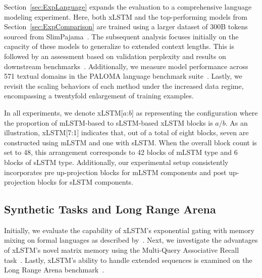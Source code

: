 Section~\ref{sec:ExpLanguage} expands the evaluation to a comprehensive language modeling experiment. Here, both xLSTM and the top-performing models from Section~\ref{sec:ExpComparison} are trained using a larger dataset of 300B tokens sourced from SlimPajama~\citep{Soboleva:23}. The subsequent analysis focuses initially on the capacity of these models to generalize to extended context lengths. This is followed by an assessment based on validation perplexity and results on downstream benchmarks~\citep{Sutawika:24}. Additionally, we measure model performance across 571 textual domains in the PALOMA language benchmark suite~\citep{Magnusson:23arxivshort}. Lastly, we revisit the scaling behaviors of each method under the increased data regime, encompassing a twentyfold enlargement of training examples.

\label{sec:xlstm_blocks_notation}
In all experiments, we denote xLSTM[$a$:$b$] as representing the configuration where the proportion of mLSTM-based to sLSTM-based xLSTM blocks is $a/b$. As an illustration, xLSTM[7:1] indicates that, out of a total of eight blocks, seven are constructed using mLSTM and one with sLSTM. When the overall block count is set to 48, this arrangement corresponds to 42 blocks of mLSTM type and 6 blocks of sLSTM type. Additionally, our experimental setup consistently incorporates pre up-projection blocks for mLSTM components and post up-projection blocks for sLSTM components.

\subsection{Synthetic Tasks and Long Range Arena}
\label{sec:ExpSyntethic}
Initially, we evaluate the capability of xLSTM’s exponential gating with memory mixing on formal languages as described by~\citet{Deletang:23}. Next, we investigate the advantages of xLSTM’s novel matrix memory using the Multi-Query Associative Recall task~\citep{Arora:23arxiv}. Lastly, xLSTM’s ability to handle extended sequences is examined on the Long Range Arena benchmark~\citep{Tay:21}.

